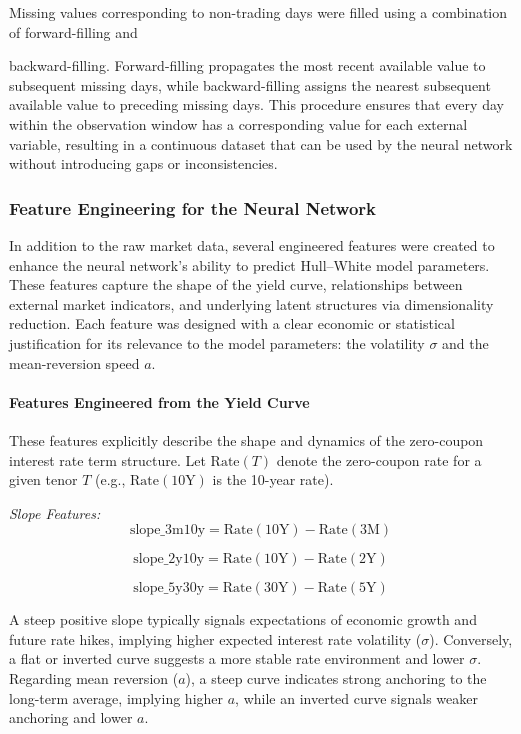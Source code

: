 Missing values corresponding to non-trading days were filled using a combination of forward-filling and {backward-filling. Forward-filling propagates the most recent available value to subsequent missing days, while backward-filling assigns the nearest subsequent available value to preceding missing days. This procedure ensures that every day within the observation window has a corresponding value for each external variable, resulting in a continuous dataset that can be used by the neural network without introducing gaps or inconsistencies.

\subsubsection{Feature Engineering for the Neural Network}
In addition to the raw market data, several engineered features were created to enhance the neural network's ability to predict Hull–White model parameters. These features capture the shape of the yield curve, relationships between external market indicators, and underlying latent structures via dimensionality reduction. Each feature was designed with a clear economic or statistical justification for its relevance to the model parameters: the volatility \(\sigma\) and the mean-reversion speed \(a\).

\paragraph{Features Engineered from the Yield Curve}
These features explicitly describe the shape and dynamics of the zero-coupon interest rate term structure. Let \(\text{Rate}(T)\) denote the zero-coupon rate for a given tenor \(T\) (e.g., \(\text{Rate}(10\text{Y})\) is the 10-year rate).

\textit{Slope Features:}
\begin{equation}
	\text{slope\_3m10y} = \text{Rate}(10\text{Y}) - \text{Rate}(3\text{M})
\end{equation}

\begin{equation}
	\text{slope\_2y10y} = \text{Rate}(10\text{Y}) - \text{Rate}(2\text{Y})
\end{equation}

\begin{equation}
	\text{slope\_5y30y} = \text{Rate}(30\text{Y}) - \text{Rate}(5\text{Y})
\end{equation}

A steep positive slope typically signals expectations of economic growth and future rate hikes, implying higher expected interest rate volatility (\(\sigma\)). Conversely, a flat or inverted curve suggests a more stable rate environment and lower \(\sigma\). Regarding mean reversion (\(a\)), a steep curve indicates strong anchoring to the long-term average, implying higher \(a\), while an inverted curve signals weaker anchoring and lower \(a\).

}
